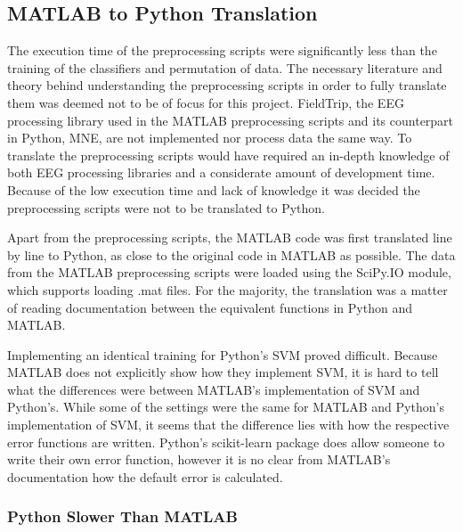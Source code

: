 \documentclass[12pt, a4paper]{article}
\begin{document}
\subsection{MATLAB to Python Translation}\label{MATPYConv}

The execution time of the preprocessing scripts were significantly less than the training of the classifiers and permutation of data. 
The necessary literature and theory behind understanding the preprocessing scripts in order to fully translate them was deemed not to be of focus for this project.
FieldTrip, the EEG processing library used in the MATLAB preprocessing scripts and its counterpart in Python, MNE, are not implemented nor process data the same way.
To translate the preprocessing scripts would have required an in-depth knowledge of both EEG processing libraries and a considerate amount of development time.
Because of the low execution time and lack of knowledge it was decided the preprocessing scripts were not to be translated to Python.

Apart from the preprocessing scripts, the MATLAB code was first translated line by line to Python, as close to the original code in MATLAB as possible.
The data from the MATLAB preprocessing scripts were loaded using the SciPy.IO module, which supports loading .mat files.
For the majority, the translation was a matter of reading documentation between the equivalent functions in Python and MATLAB.

Implementing an identical training for Python's SVM proved difficult.
Because MATLAB does not explicitly show how they implement SVM, it is hard to tell what the differences were between MATLAB's implementation of SVM and Python's.
While some of the settings were the same for MATLAB and Python's implementation of SVM, it seems that the difference lies with how the respective error functions are written.
Python's scikit-learn package does allow someone to write their own error function, however it is no clear from MATLAB's documentation how the default error is calculated. %

\subsubsection{Python Slower Than MATLAB}
\end{document}
